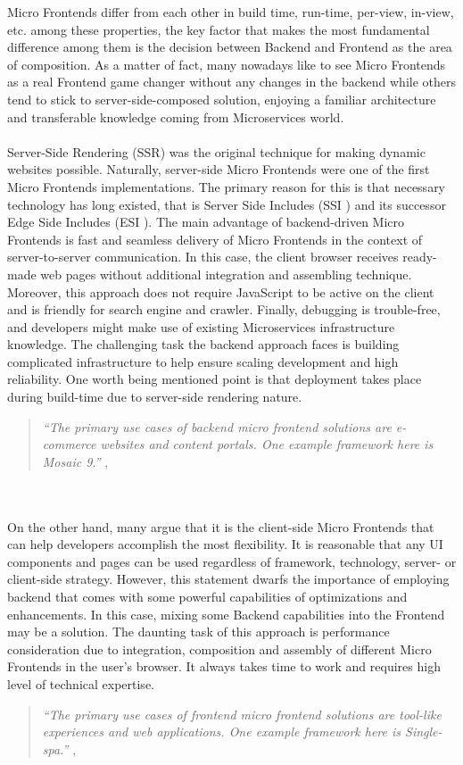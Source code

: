 \documentclass[a4paper]{book}
\begin{document}
Micro Frontends differ from each other in build time, run-time, per-view, in-view, etc. among these properties, the key factor that makes the most fundamental difference among them is the decision between Backend and Frontend as the area of composition. As a matter of fact, many nowadays like to see Micro Frontends as a real Frontend game changer without any changes in the backend while others tend to stick to server-side-composed solution, enjoying a familiar architecture and transferable knowledge coming from Microservices world. 
\\ 
\\
Server-Side Rendering (SSR) was the original technique for making dynamic websites possible. Naturally, server-side Micro Frontends were one of the first Micro Frontends implementations. The primary reason for this is that necessary technology has long existed, that is Server Side Includes (SSI \cite{SSI}) and its successor Edge Side Includes (ESI \cite{ESI}). The main advantage of backend-driven Micro Frontends is fast and seamless delivery of Micro Frontends in the context of server-to-server communication. In this case, the client browser receives ready-made web pages without additional integration and assembling technique. Moreover, this approach does not require JavaScript to be active on the client and is friendly for search engine and crawler. Finally, debugging is trouble-free, and developers might make use of existing Microservices infrastructure knowledge. The challenging task the backend approach faces is building complicated infrastructure to help ensure scaling development and high reliability. One worth being mentioned point is that deployment takes place during build-time due to server-side rendering nature. \cite{Rap20}
\begin{quote}
    \textit{“The primary use cases of backend micro frontend solutions are e-commerce websites and content portals. One example framework here is Mosaic 9.”} \cite{Zalando}, \cite{Rap20}
\end{quote}
\\ 
\\
On the other hand, many argue that it is the client-side Micro Frontends that can help developers accomplish the most flexibility. It is reasonable that any UI components and pages can be used regardless of framework, technology, server- or client-side strategy. However, this statement dwarfs the importance of employing backend that comes with some powerful capabilities of optimizations and enhancements. In this case, mixing some Backend capabilities into the Frontend may be a solution. The daunting task of this approach is performance consideration due to integration, composition and assembly of different Micro Frontends in the user’s browser. It always takes time to work and requires high level of technical expertise. \cite{Rap20}
\begin{quote}
    \textit{“The primary use cases of frontend micro frontend solutions are tool-like experiences and web applications. One example framework here is Single-spa.”} \cite{SingleSPA}, \cite{Rap20}
\end{quote}
\end{document}
